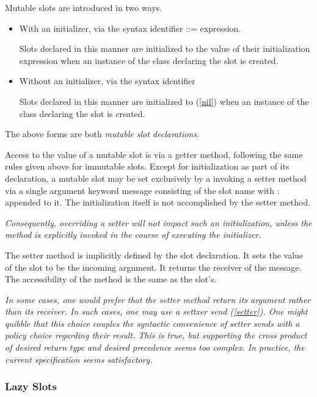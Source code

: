 \documentclass{article}
\newcommand{\code}[1]{{\sf #1}}
\begin{document}
Mutable slots are introduced in two ways.
\begin{itemize}
\item
With an initializer,  via the syntax \code{identifier ::= expression.}
%

Slots declared in this manner are initialized to the value of their initialization expression when an instance of the class declaring the slot is created.
\item
Without an initializer, via the syntax \code{identifier}

Slots declared in this manner are initialized to \NIL{ } (\ref{nil}) when an instance of the class declaring the slot is created.
\end{itemize}

The above forms are both {\em mutable slot declarations.}

Access to the value of a mutable slot is via a getter method,  following the same rules given above for immutable slots.  Except for initialization as part of its declaration, a mutable slot may be set exclusively by a invoking a setter method via a single argument keyword message consisting of the slot name with : appended to it.   The initialization itself is not accomplished by the setter method.

{\it
Consequently, overriding a setter will not impact such an initialization, unless the method is explicitly invoked in the course of executing the initializer.
}

The setter method is implicitly defined by the slot declaration. It sets the value of the slot to be the incoming argument. It returns the receiver of the message. The accessibility of the method is the same as the slot's.



{\it 
In some cases, one would prefer that the setter method return its argument rather than its receiver.
In such cases, one may use a settxer send (\ref{setter}). One might quibble that this choice couples the syntactic convenience of setter sends with a policy choice regarding their result. This is true, but supporting the cross product of desired return type and desired precedence seems too complex. In practice, the current specification seems satisfactory.
}

\subsubsection{Lazy Slots}
\label{lazySlots}
\end{document}
